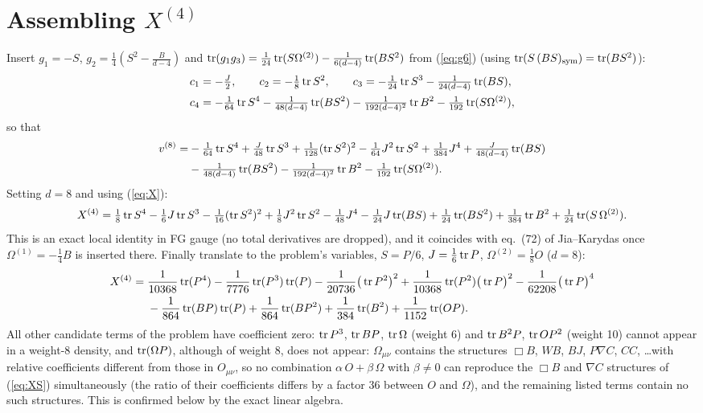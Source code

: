 \section{Assembling $X^{(4)}$}
Insert $g_1=-S$, $g_2=\frac14(S^2-\frac{B}{d-4})$ and $\operatorname{tr}(g_1g_3)=\frac1{24}\operatorname{tr}(S\Omega^{(2)})-\frac{1}{6(d-4)}\operatorname{tr}(BS^2)$ from (\ref{eq:g6}) (using $\operatorname{tr}(S\,(BS)_{\rm sym})=\operatorname{tr}(BS^2)$):
\begin{align}
c_1&=-\tfrac J2,\qquad c_2=-\tfrac18\operatorname{tr} S^2,\qquad c_3=-\tfrac1{24}\operatorname{tr} S^3-\tfrac{1}{24(d-4)}\operatorname{tr}(BS),\\
c_4&=-\tfrac1{64}\operatorname{tr} S^4-\tfrac{1}{48(d-4)}\operatorname{tr}(BS^2)-\tfrac{1}{192(d-4)^2}\operatorname{tr} B^2-\tfrac1{192}\operatorname{tr}(S\Omega^{(2)}),
\end{align}
so that
\begin{equation}
\begin{split}
v^{(8)}=&-\tfrac1{64}\operatorname{tr} S^4+\tfrac{J}{48}\operatorname{tr} S^3+\tfrac1{128}(\operatorname{tr} S^2)^2-\tfrac{1}{64}J^2\operatorname{tr} S^2+\tfrac1{384}J^4
+\tfrac{J}{48(d-4)}\operatorname{tr}(BS)\\
&-\tfrac{1}{48(d-4)}\operatorname{tr}(BS^2)-\tfrac{1}{192(d-4)^2}\operatorname{tr} B^2-\tfrac1{192}\operatorname{tr}(S\Omega^{(2)}).
\end{split}
\end{equation}
Setting $d=8$ and using (\ref{eq:X}):
\begin{equation}
X^{(4)}=\tfrac18\operatorname{tr} S^4-\tfrac16 J\operatorname{tr} S^3-\tfrac1{16}(\operatorname{tr} S^2)^2+\tfrac18J^2\operatorname{tr} S^2-\tfrac1{48}J^4
-\tfrac1{24}J\operatorname{tr}(BS)+\tfrac1{24}\operatorname{tr}(BS^2)+\tfrac1{384}\operatorname{tr} B^2+\tfrac1{24}\operatorname{tr}(S\,\Omega^{(2)}) .
\label{eq:XS}
\end{equation}
This is an exact local identity in FG gauge (no total derivatives are dropped), and it coincides with eq.~(72) of Jia--Karydas once $\Omega^{(1)}=-\frac14B$ is inserted there. Finally translate to the problem's variables, $S=P/6$, $J=\frac16\operatorname{tr} P$, $\Omega^{(2)}=\frac18O$ ($d=8$):
\begin{align}
X^{(4)}=\;&\frac{1}{10368}\operatorname{tr}(P^4)-\frac{1}{7776}\operatorname{tr}(P^3)\operatorname{tr}(P)-\frac{1}{20736}\big(\operatorname{tr} P^2\big)^2+\frac{1}{10368}\operatorname{tr}(P^2)\big(\operatorname{tr} P\big)^2-\frac{1}{62208}\big(\operatorname{tr} P\big)^4\nonumber\\
&-\frac{1}{864}\operatorname{tr}(BP)\operatorname{tr}(P)+\frac{1}{864}\operatorname{tr}(BP^2)+\frac{1}{384}\operatorname{tr}(B^2)+\frac{1}{1152}\operatorname{tr}(OP).
\label{eq:XP}
\end{align}
All other candidate terms of the problem have coefficient zero: $\operatorname{tr} P^3$, $\operatorname{tr} BP$, $\operatorname{tr}\Omega$ (weight 6) and $\operatorname{tr} B^2P$, $\operatorname{tr} OP^2$ (weight 10) cannot appear in a weight-8 density, and $\operatorname{tr}(\Omega P)$, although of weight 8, does not appear: $\Omega_{\mu\nu}$ contains the structures $\Box B$, $WB$, $BJ$, $P\nabla C$, $CC$, \dots with relative coefficients different from those in $O_{\mu\nu}$, so no combination $\alpha\,O+\beta\,\Omega$ with $\beta\neq0$ can reproduce the $\Box B$ and $\nabla C$ structures of (\ref{eq:XS}) simultaneously (the ratio of their coefficients differs by a factor $36$ between $O$ and $\Omega$), and the remaining listed terms contain no such structures. This is confirmed below by the exact linear algebra.

